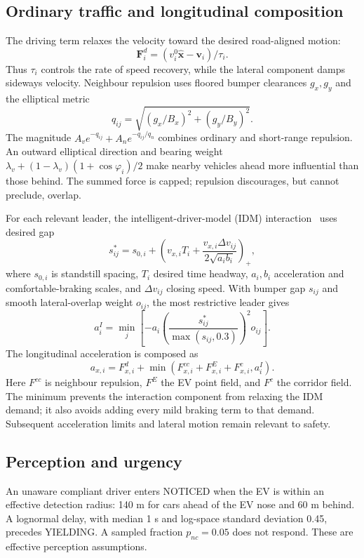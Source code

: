 \documentclass[conference,a4paper]{IEEEtran}
\newcommand{\pos}[1]{\left(#1\right)_+}
\begin{document}
\subsection{Ordinary traffic and longitudinal composition}
The driving term relaxes the velocity toward the desired road-aligned motion:
\begin{equation}
\mathbf F_i^d=(v_i^0\hat{\mathbf x}-\mathbf v_i)/\tau_i.
\end{equation}
Thus $\tau_i$ controls the rate of speed recovery, while the lateral component damps sideways velocity. Neighbour repulsion uses floored bumper clearances $g_x,g_y$ and the elliptical metric
\begin{equation}
q_{ij}=\sqrt{(g_x/B_x)^2+(g_y/B_y)^2}.
\end{equation}
The magnitude $A_v e^{-q_{ij}}+A_n e^{-q_{ij}/q_n}$ combines ordinary and short-range repulsion. An outward elliptical direction and bearing weight $\lambda_v+(1-\lambda_v)(1+\cos\varphi_i)/2$ make nearby vehicles ahead more influential than those behind. The summed force is capped; repulsion discourages, but cannot preclude, overlap.

For each relevant leader, the intelligent-driver-model (IDM) interaction~\cite{treiber00} uses desired gap
\begin{equation}
s^*_{ij}=s_{0,i}+\pos{v_{x,i}T_i+
\frac{v_{x,i}\Delta v_{ij}}{2\sqrt{a_i b_i}}},
\end{equation}
where $s_{0,i}$ is standstill spacing, $T_i$ desired time headway, $a_i,b_i$ acceleration and comfortable-braking scales, and $\Delta v_{ij}$ closing speed. With bumper gap $s_{ij}$ and smooth lateral-overlap weight $o_{ij}$, the most restrictive leader gives
\begin{equation}
a_i^{I}=\min_j\left[-a_i\left(\frac{s^*_{ij}}{\max(s_{ij},0.3)}\right)^2o_{ij}\right].
\end{equation}
The longitudinal acceleration is composed as
\begin{equation}
a_{x,i}=F^d_{x,i}+\min(F^{cc}_{x,i}+F^E_{x,i}+F^c_{x,i},a_i^{I}).
\label{eq:compose}
\end{equation}
Here $F^{cc}$ is neighbour repulsion, $F^E$ the EV point field, and $F^c$ the corridor field. The minimum prevents the interaction component from relaxing the IDM demand; it also avoids adding every mild braking term to that demand. Subsequent acceleration limits and lateral motion remain relevant to safety.

\subsection{Perception and urgency}
An unaware compliant driver enters NOTICED when the EV is within an effective detection radius: 140 m for cars ahead of the EV nose and 60 m behind. A lognormal delay, with median 1 s and log-space standard deviation 0.45, precedes YIELDING. A sampled fraction $p_{nc}=0.05$ does not respond. These are effective perception assumptions.
\end{document}
